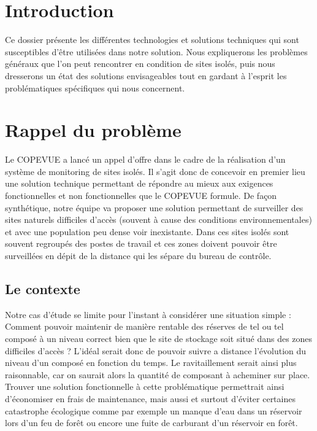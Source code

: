 \section{Introduction}

Ce dossier présente les différentes technologies et solutions techniques qui sont susceptibles d'être utilisées dans notre solution. Nous expliquerons les problèmes généraux que l'on peut rencontrer en condition de sites isolés, puis nous dresserons un état des solutions envisageables tout en gardant à l'esprit les problématiques spécifiques qui nous concernent.

\section{Rappel du problème}

Le COPEVUE a lancé un appel d'offre dans le cadre de la réalisation d'un système de monitoring de sites isolés. Il s'agit donc de concevoir en premier lieu une solution technique permettant de répondre au mieux aux exigences fonctionnelles et non fonctionnelles que le COPEVUE formule. De façon synthétique, notre équipe va proposer une solution permettant de surveiller des sites naturels difficiles d'accès (souvent à cause des conditions environnementales) et avec une population peu dense voir inexistante. Dans ces sites isolés sont souvent regroupés des postes de travail et ces zones doivent pouvoir être surveillées en dépit de la distance qui les sépare du bureau de contrôle.

\subsection{Le contexte}

Notre cas d'étude se limite pour l'instant à considérer une situation simple : Comment pouvoir maintenir de manière rentable des réserves de tel ou tel composé à un niveau correct bien que le site de stockage soit situé dans des zones difficiles d'accès ? L'idéal serait donc de pouvoir suivre a distance l'évolution du niveau d'un composé en fonction du temps. Le ravitaillement serait ainsi plus raisonnable, car on saurait alors la quantité de composant à acheminer sur place. Trouver une solution fonctionnelle à cette problématique permettrait ainsi d'économiser en frais de maintenance, mais aussi et surtout d'éviter certaines catastrophe écologique comme par exemple un manque d'eau dans un réservoir lors d'un feu de forêt ou encore une fuite de carburant d'un réservoir en forêt.

